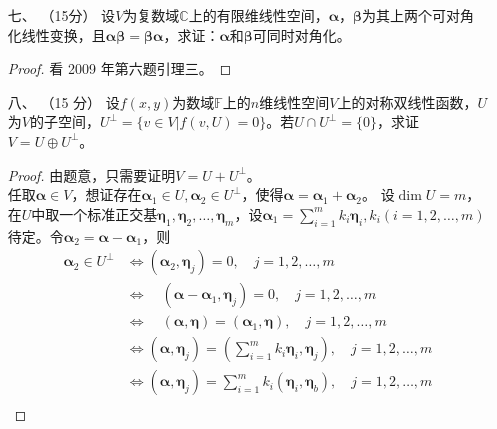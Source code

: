 \begin{enumerate}[1~]
\item[七、]（15分）
设$V$为复数域$\mathbb{C}$上的有限维线性空间，$ \boldsymbol{\alpha}$，$\boldsymbol{\beta}$为其上两个可对角化线性变换，且$\boldsymbol{\alpha}\boldsymbol{\beta}=\boldsymbol{\beta}\boldsymbol{\alpha}$，求证：$\boldsymbol{\alpha}$和$\boldsymbol{\beta}$可同时对角化。
\begin{proof}
看 2009 年第六题引理三。
\end{proof}

\item[八、]（15 分）
设$f(x, y)$为数域$\mathbb{F}$上的$n$维线性空间$V$上的对称双线性函数，$U$为$V$的子空间，$U ^ { \perp } = \{ v \in V | f ( v , U ) = 0 \}$。若$U \cap U ^ { \perp } = \{ 0 \}$，求证$V = U \oplus U ^ { \perp }$。
\begin{proof}
由题意，只需要证明$V=U+U^{\perp}$。\\
任取$\boldsymbol{\alpha} \in V$，想证存在$\boldsymbol{\alpha} _ { 1 } \in U , \boldsymbol{\alpha} _ { 2 } \in U ^ { \perp }$，使得$\boldsymbol{\alpha} = \boldsymbol{\alpha} _ { 1 } + \boldsymbol{\alpha} _ { 2 }$。
设$\dim U=m$，在$U$中取一个标准正交基$\boldsymbol{\eta} _ { 1 } , \boldsymbol{\eta} _ { 2 } , \dots , \boldsymbol{\eta} _ { m }$，设$\boldsymbol{\alpha} _ { 1 } = \sum _ { i = 1 } ^ { m } k _ { i } \boldsymbol{\eta} _ { i } , k _ { i } ( i = 1,2 , \dots , m )$待定。令$\boldsymbol{\alpha} _ { 2 } =\boldsymbol{\alpha} - \boldsymbol{\alpha} _ { 1 }$，则
\begin{align*}
\boldsymbol{\alpha} _ { 2 } \in U ^ { \perp } &\Longleftrightarrow \left( \boldsymbol{\alpha} _ { 2 } , \boldsymbol{\eta} _ { j } \right) = 0 , \quad j = 1,2 , \dots , m\\
&\Longleftrightarrow \quad \left( \boldsymbol{\alpha} - \boldsymbol{\alpha} _ { 1 } , \boldsymbol{\eta} _ { j } \right) = 0 , \quad j = 1,2 , \dots , m\\
&\Longleftrightarrow \quad ( \boldsymbol{\alpha} , \boldsymbol{\eta} ) = \left( \boldsymbol{\alpha} _ { 1 } , \boldsymbol{\eta} \right) , \quad j = 1,2 , \dots , m\\
&\Longleftrightarrow \left( \boldsymbol{\alpha} , \boldsymbol{\eta} _ { j } \right) = \left( \sum _ { i = 1 } ^ { m } k _ { i } \boldsymbol{\eta} _ { i } , \boldsymbol{\eta} _ { j } \right) , \quad j = 1,2 , \dots , m\\
&\Longleftrightarrow \left( \boldsymbol{\alpha} , \boldsymbol{\eta} _ { j } \right) = \sum _ { i = 1 } ^ { m } k _ { i } \left( \boldsymbol{\eta} _ { i } , \boldsymbol{\eta} _ { b } \right) , \quad j = 1,2 , \dots , m\\

\end{align*}
\end{proof}
\end{enumerate}
